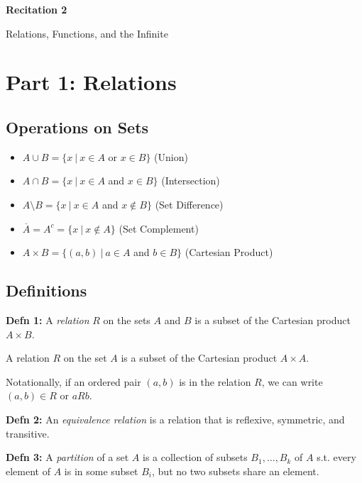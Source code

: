 \documentclass[12pt,letterpaper]{article}
\begin{document}
  \thispagestyle{firstpagestyle}
  \begin{center}
    {\large \textbf{Recitation 2}}
    
    {\large Relations, Functions, and the Infinite}
  \end{center}
  
  

      \section*{Part 1: Relations}

	 \subsection*{Operations on Sets}
	
	
\begin{itemize}
    \item $A \cup B = \{ x \ |\  x \in A$ or $ x \in B \}$ (Union)
    \item $A \cap B = \{ x\ |\ x \in A$ and $ x \in B \}$ (Intersection)
    \item $A \setminus B = \{ x\ |\ x \in A$ and $ x \notin B \}$ (Set Difference)
    \item $ \overline{A} = A^c = \{ x\ |\ x \not\in A \}$ (Set Complement)
	\item $A \times B = \{(a,b) \ | \ a \in A $ and $ b \in B\}$ (Cartesian Product)
\end{itemize} 

	\subsection*{Definitions}

\textbf{Defn 1:} A \textit{relation} $R$ on the sets $A$ and $B$ is a subset of the Cartesian product $A \times B$. 

A relation $R$ on the set $A$ is a subset of the Cartesian product $A \times A$. 

Notationally, if an ordered pair $(a,b)$ is in the relation $R$, we can write $(a,b) \in R$ or $aRb$.

\textbf{Defn 2:} An \textit{equivalence relation} is a relation that is reflexive, symmetric, and transitive.

\textbf{Defn 3:} A \textit{partition} of a set $A$ is a collection of subsets $B_1, \ldots, B_k$ of $A$ s.t. every element of $A$ is in some subset $B_i$, but no two subsets share an element.
\end{document}
